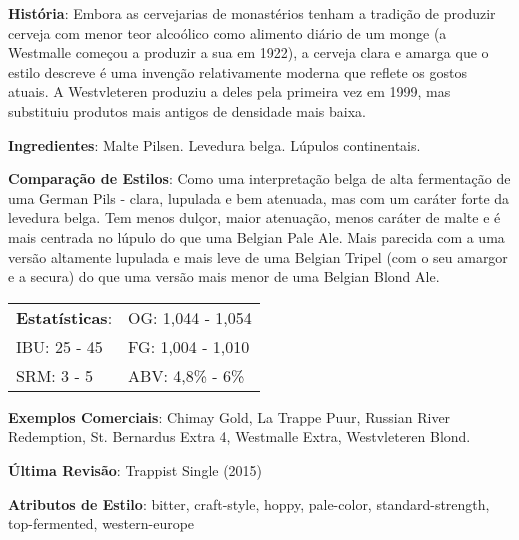 \textbf{História}: Embora as cervejarias de monastérios tenham a tradição de produzir cerveja com menor teor alcoólico como alimento diário de um monge (a Westmalle começou a produzir a sua em 1922), a cerveja clara e amarga que o estilo descreve é uma invenção relativamente moderna que reflete os gostos atuais. A Westvleteren produziu a deles pela primeira vez em 1999, mas substituiu produtos mais antigos de densidade mais baixa.

\textbf{Ingredientes}: Malte Pilsen. Levedura belga. Lúpulos continentais.

\textbf{Comparação de Estilos}: Como uma interpretação belga de alta fermentação de uma German Pils - clara, lupulada e bem atenuada, mas com um caráter forte da levedura belga. Tem menos dulçor, maior atenuação, menos caráter de malte e é mais centrada no lúpulo do que uma Belgian Pale Ale. Mais parecida com a uma versão altamente lupulada e mais leve de uma Belgian Tripel (com o seu amargor e a secura) do que uma versão mais menor de uma Belgian Blond Ale.

\begin{tabular}{@{}p{35mm}p{35mm}@{}}
  \textbf{Estatísticas}: & OG: 1,044 - 1,054 \\
  IBU: 25 - 45  & FG: 1,004 - 1,010  \\
  SRM: 3 - 5  & ABV: 4,8\% - 6\%
\end{tabular}

\textbf{Exemplos Comerciais}: Chimay Gold, La Trappe Puur, Russian River Redemption, St. Bernardus Extra 4, Westmalle Extra, Westvleteren Blond.

\textbf{Última Revisão}: Trappist Single (2015)

\textbf{Atributos de Estilo}: bitter, craft-style, hoppy, pale-color, standard-strength, top-fermented, western-europe
